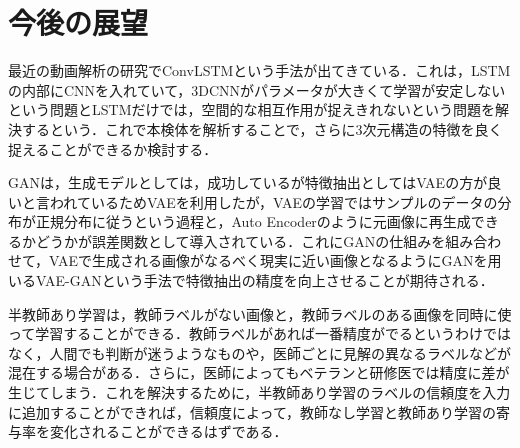 \section{今後の展望}

最近の動画解析の研究でConvLSTMという手法が出てきている．これは，LSTMの内部にCNNを入れていて，3DCNNがパラメータが大きくて学習が安定しないという問題とLSTMだけでは，空間的な相互作用が捉えきれないという問題を解決するという\cite{要出典}．これで本検体を解析することで，さらに3次元構造の特徴を良く捉えることができるか検討する．

GANは，生成モデルとしては，成功しているが特徴抽出としてはVAEの方が良いと言われているためVAEを利用したが，VAEの学習ではサンプルのデータの分布が正規分布に従うという過程と，Auto Encoderのように元画像に再生成できるかどうかが誤差関数として導入されている．これにGANの仕組みを組み合わせて，VAEで生成される画像がなるべく現実に近い画像となるようにGANを用いるVAE-GANという手法で特徴抽出の精度を向上させることが期待される\cite{要出典}．

半教師あり学習は，教師ラベルがない画像と，教師ラベルのある画像を同時に使って学習することができる．教師ラベルがあれば一番精度がでるというわけではなく，人間でも判断が迷うようなものや，医師ごとに見解の異なるラベルなどが混在する場合がある．さらに，医師によってもベテランと研修医では精度に差が生じてしまう．これを解決するために，半教師あり学習のラベルの信頼度を入力に追加することができれば，信頼度によって，教師なし学習と教師あり学習の寄与率を変化されることができるはずである．